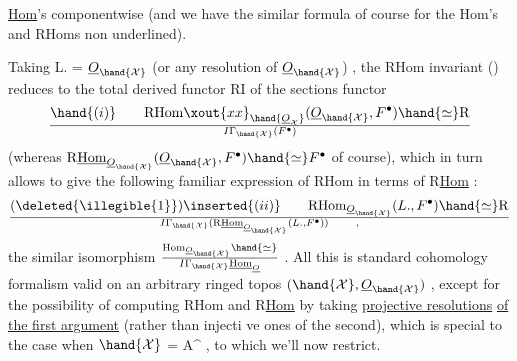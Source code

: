 
\uline{Hom}'s componentwise  (and we have the similar formula of course for the
Hom's and RHoms  non underlined). 

Taking  L. = $\underline{O}_{\hand{\mathcal{X}}}$ (or any resolution of $\underline{O}_{\hand{\mathcal{X}}}$) ,  the RHom invariant
(\hand{*})  reduces to the total derived functor  RI  of the sections functor
\[ \hand{(i)} \qquad \mathrm{RHom}\xout{xx}_{\hand{\underline{O}_{\mathcal{X}}}}(\underline{O}_{\hand{\mathcal{X}}},F^\bullet)\hand{\simeq} \mathrm{R}\over{I}{\Gamma}_{\hand{\mathcal{X}}}(F^\bullet) \]
(whereas  $\mathrm{R}\underline{\mathrm{Hom}}_{\underline{O}_{\hand{\mathcal{X}}}}(\underline{O}_{\hand{\mathcal{X}}},F^\bullet)\hand{\simeq}F^\bullet$  of course),  which in turn allows to give
the following familiar expression of RHom in terms of R\uline{Hom}  :
\[ (\deleted{\illegible{1}})\inserted{(ii)} \qquad \mathrm{RHom}_{\underline{O}_{\hand{\mathcal{X}}}}(L.,F^\bullet)\hand{\simeq} \mathrm{R}\over{I}{\Gamma}_{\hand{\mathcal{X}}}(\mathrm{R}\underline{\mathrm{Hom}}_{\underline{O}_{\hand{\mathcal{X}}}}(L.,F^\bullet)) \qquad , \]
 the similar isomorphism  $\mathrm{Hom}_{\underline{O}_{\hand{\mathcal{X}}}}\hand{\simeq}\over{I}{\Gamma}_{\hand{\mathcal{X}}}\underline{\mathrm{Hom}}_{\underline{O}}$ .  All this is
standard cohomology formalism\hand{,} valid on an arbitrary  ringed topos
$(\hand{\mathcal{X}},\underline{O}_{\hand{\mathcal{X}}})$ ,  except for the possibility of computing RHom and R\uline{Hom}  by 
taking \uline{projective resolutions} \uline{of the first argument} (rather than injecti
ve ones of the second),  which is special to the case  when $\hand{\mathcal{X}}$ = A\^{} ,
to which we'll now restrict.

